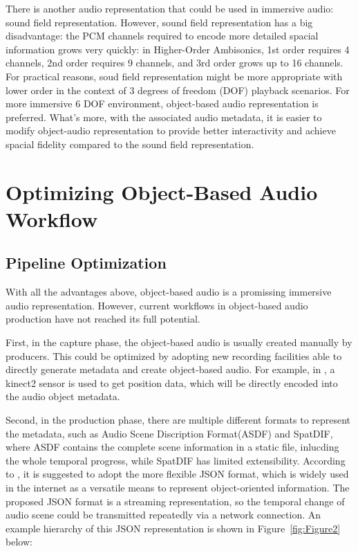 \documentclass[jou]{apa6}
\begin{document}
There is another audio representation that could be used in immersive audio: sound field representation. However, sound field representation has a big disadvantage: the PCM channels required to encode more detailed spacial information grows very quickly: in Higher-Order Ambisonics, 1st order requires 4 channels, 2nd order requires 9 channels, and 3rd order grows up to 16 channels. For practical reasons, soud field representation might be more appropriate with lower order in the context of 3 degrees of freedom (DOF) playback scenarios. For more immersive 6 DOF environment, object-based audio representation is preferred. What's more, with the associated audio metadata, it is easier to modify object-audio representation to provide better interactivity and achieve spacial fidelity compared to the sound field representation.

\section{Optimizing Object-Based Audio Workflow}

\subsection{Pipeline Optimization}

With all the advantages above, object-based audio is a promissing immersive audio representation. However, current workflows in object-based audio production have not reached its full potential.

First, in the capture phase, the object-based audio is usually created manually by producers. This could be optimized by adopting new recording facilities able to directly generate metadata and create object-based audio. For example, in \textcite{coleman2018audio}, a kinect2 sensor is used to get position data, which will be directly encoded into the audio object metadata.

Second, in the production phase, there are multiple different formats to represent the metadata, such as Audio Scene Discription Format(ASDF) and SpatDIF, where ASDF contains the complete scene information in a static file, inlucding the whole temporal progress, while SpatDIF has limited extensibility. According to \textcite{coleman2018audio}, it is suggested to adopt the more flexible JSON format, which is widely used in the internet as a versatile means to represent object-oriented information. The proposed JSON format is a streaming representation, so the temporal change of audio scene could be transmitted repeatedly via a network connection. An example hierarchy of this JSON representation is shown in Figure~\ref{fig:Figure2} below:
\end{document}
